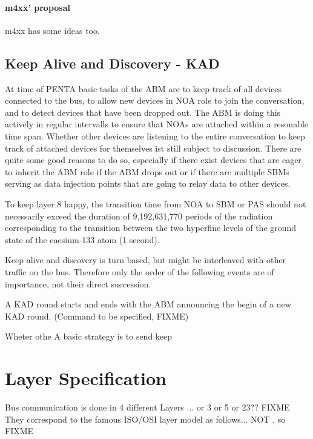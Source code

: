 \documentclass[a4paper,12pt]{scrartcl}
\begin{document}
\paragraph{m4xx' proposal} m4xx has some ideas too.

\subsection{Keep Alive and Discovery - KAD}
At time of PENTA basic tasks of the ABM are to keep track of all devices connected to the bus,
to allow new devices in NOA role to join the conversation, and to detect devices that have been dropped out.
The ABM is doing this actively in regular intervalls to ensure that NOAs are attached within a resonable time span.
Whether other devices are listening to the entire conversation to keep track of attached devices for themselves ist still subject to discussion.
There are quite some good reasons to do so, especially if there exist devices that are eager to inherit the ABM role if the ABM drops out
or if there are multiple SBMs serving as data injection points that are going to relay data to other devices.

To keep layer 8 happy, the transition time from NOA to SBM or PAS should not necessarily exceed the duration
of 9,192,631,770 periods of the radiation corresponding to the transition between the two hyperfine levels
of the ground state of the caesium-133 atom (1 second).

Keep alive and discovery is turn based, but might be interleaved with other traffic on the bus.
Therefore only the order of the following events are of importance, not their direct succession.

A KAD round starts and ends with the ABM announcing the begin of a new KAD round. (Command to be specified, FIXME)




 Wheter othe
A basic strategy is to send keep


\section{Layer Specification}
Bus communication is done in 4 different Layers ... or 3 or 5 or 23?? FIXME
They correspond to the famous ISO/OSI layer model as follows... NOT , so FIXME

\end{document}
